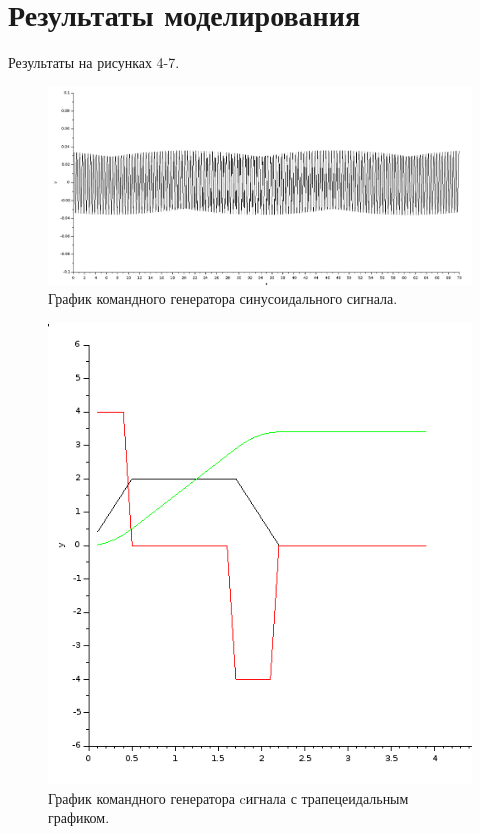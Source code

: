 \documentclass[12pt, a4paper] {ncc}
\begin{document}
\section{Результаты моделирования}

	Результаты на рисунках 4-7.
	\begin{figure}[ht!]
		\includegraphics[scale=0.4]{./plot_sin.png}
		\caption{График командного генератора синусоидального сигнала.}
	\end{figure}
	\begin{figure}[ht!]
		\includegraphics[scale=0.5]{./plot_trap.png}
		\caption{График командного генератора cигнала с трапецеидальным графиком.}
	\end{figure}
\end{document}
